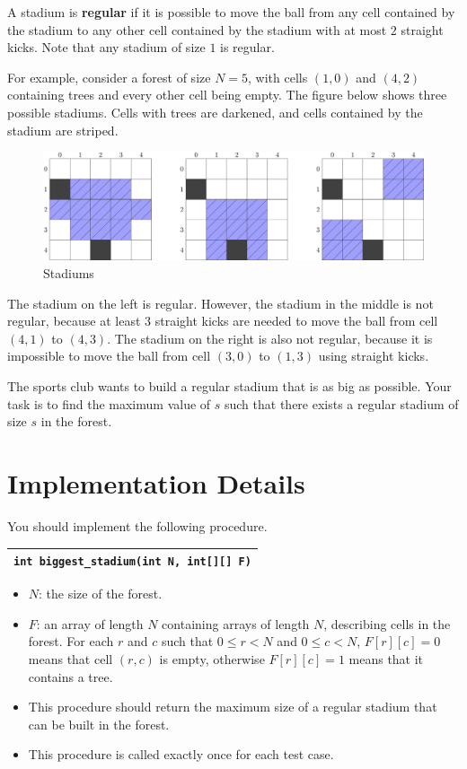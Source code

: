 A stadium is \textbf{regular} if it is possible to move the ball from
any cell contained by the stadium to any other cell contained by the
stadium with at most $2$ straight kicks. Note that any stadium of size
$1$ is regular.

For example, consider a forest of size $N = 5$, with cells $(1,0)$
and $(4,2)$ containing trees and every other cell being empty. The
figure below shows three possible stadiums. Cells with trees are
darkened, and cells contained by the stadium are striped.

\begin{figure}[h!]
\centering
\includegraphics[width=5in]{soccer-example.png}
\caption{Stadiums}
\end{figure}

The stadium on the left is regular. However, the stadium in the middle
is not regular, because at least $3$ straight kicks are needed to move
the ball from cell $(4,1)$ to $(4,3)$. The stadium on the right is
also not regular, because it is impossible to move the ball from cell
$(3,0)$ to $(1,3)$ using straight kicks.

The sports club wants to build a regular stadium that is as big as
possible. Your task is to find the maximum value of $s$ such that
there exists a regular stadium of size $s$ in the forest.

\section*{Implementation Details}

You should implement the following procedure.

\begin{tabular}{| l |}
  \hline
  \verb|int biggest_stadium(int N, int[][] F)| \\
  \hline
\end{tabular}

\begin{itemize}
\item
  $N$: the size of the forest.
\item
  $F$: an array of length $N$ containing arrays of length $N$,
  describing cells in the forest. For each $r$ and $c$ such that
  $0 \le r < N$ and $0 \le c < N$, $F[r][c] = 0$ means that
  cell $(r, c)$ is empty, otherwise $F[r][c] = 1$ means that it
  contains a tree.
\item
  This procedure should return the maximum size of a regular stadium
  that can be built in the forest.
\item
  This procedure is called exactly once for each test case.
\end{itemize}


